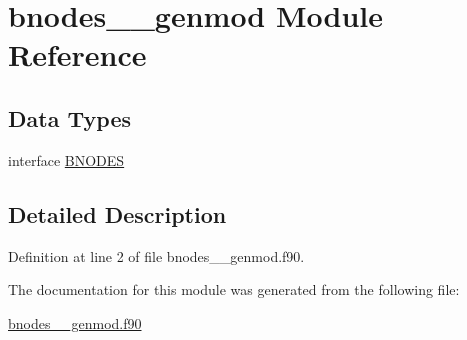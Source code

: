 \hypertarget{classbnodes____genmod}{\section{bnodes\+\_\+\+\_\+genmod Module Reference}
\label{classbnodes____genmod}
}
\subsection*{Data Types}
\begin{DoxyCompactItemize}
\item 
interface \hyperlink{interfacebnodes____genmod_1_1BNODES}{B\+N\+O\+D\+E\+S}
\end{DoxyCompactItemize}


\subsection{Detailed Description}


Definition at line 2 of file bnodes\+\_\+\+\_\+genmod.\+f90.



The documentation for this module was generated from the following file\+:\begin{DoxyCompactItemize}
\item 
\hyperlink{bnodes____genmod_8f90}{bnodes\+\_\+\+\_\+genmod.\+f90}\end{DoxyCompactItemize}
